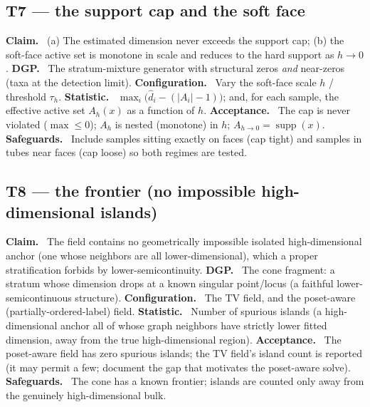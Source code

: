\documentclass[11pt]{article}
\theoremstyle{definition}
\newcommand{\supp}{\operatorname{supp}}
\newcommand{\field}[1]{\smallskip\noindent\textbf{\textsf{#1.}}\ }
\begin{document}
\subsection{T7 --- the support cap and the soft face}
\field{Claim} (a) The estimated dimension never exceeds the support cap; (b) the
soft-face active set is monotone in scale and reduces to the hard support as
$h\to 0$.
\field{DGP} The stratum-mixture generator with structural zeros \emph{and}
near-zeros (taxa at the detection limit).
\field{Configuration} Vary the soft-face scale $h$ / threshold $\tau_h$.
\field{Statistic} $\max_i\big(\widehat d_i-(|A_i|-1)\big)$; and, for each sample,
the effective active set $A_h(x)$ as a function of $h$.
\field{Acceptance} The cap is never violated ($\max\le 0$); $A_h$ is nested
(monotone) in $h$; $A_{h\to 0}=\supp(x)$.
\field{Safeguards} Include samples sitting exactly on faces (cap tight) and
samples in tubes near faces (cap loose) so both regimes are tested.

\subsection{T8 --- the frontier (no impossible high-dimensional islands)}
\field{Claim} The field contains no geometrically impossible isolated
high-dimensional anchor (one whose neighbors are all lower-dimensional), which a
proper stratification forbids by lower-semicontinuity.
\field{DGP} The cone fragment: a stratum whose dimension drops at a known
singular point/locus (a faithful lower-semicontinuous structure).
\field{Configuration} The TV field, and the poset-aware (partially-ordered-label)
field.
\field{Statistic} Number of spurious islands (a high-dimensional anchor all of
whose graph neighbors have strictly lower fitted dimension, away from the true
high-dimensional region).
\field{Acceptance} The poset-aware field has zero spurious islands; the TV field's
island count is reported (it may permit a few; document the gap that motivates the
poset-aware solve).
\field{Safeguards} The cone has a known frontier; islands are counted only away
from the genuinely high-dimensional bulk.
\end{document}
